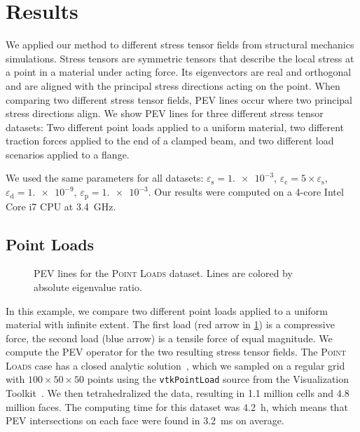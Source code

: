 \section{Results} %
\label{sec:pev_results}
%
We applied our method to different stress tensor fields from structural
mechanics simulations.
%
Stress tensors are symmetric tensors that describe the local stress at a point
in a material under acting force.
%
Its eigenvectors are real and orthogonal and are aligned with the principal
stress directions acting on the point.
%
When comparing two different stress tensor fields, \ac{PEV} lines occur where
two principal stress directions align.
%
We show \ac{PEV} lines for three different stress tensor datasets:
%
Two different point loads applied to a uniform material, two different traction
forces applied to the end of a clamped beam, and two different load scenarios
applied to a flange.
%

%
We used the same parameters for all datasets:
%
$\varepsilon_\mathrm{s} = \num{1.e-3}$, $\varepsilon_\mathrm{c} = 5 \times
\varepsilon_\mathrm{s}$, $\varepsilon_\mathrm{d} = \num{1.e-9}$,
$\varepsilon_\mathrm{p} = \num{1.e-3}$.
%
Our results were computed on a 4-core Intel Core i7 \ac{CPU} at
\SI{3.4}{\giga\hertz}.
%
\subsection{Point Loads} %
\label{ssub:point_loads}
%
\begin{figure}[t]
    \setlength\figurewidth\textwidth
    \centering
    
    \caption{\ac{PEV} lines for the \textsc{Point Loads} dataset. Lines are
             colored by absolute eigenvalue ratio.}
    \label{fig:point_load}
\end{figure}
%
In this example, we compare two different point loads applied to a uniform
material with infinite extent.
%
The first load (red arrow in \cref{fig:point_load}) is a compressive force,
the second load (blue arrow) is a tensile force of equal magnitude.
%
We compute the \ac{PEV} operator for the two resulting stress tensor fields.
%
The \textsc{Point Loads} case has a closed analytic solution~\cite{Saada2013},
which we sampled on a regular grid with $\num{100} \times \num{50} \times
\num{50}$ points using the \texttt{vtkPointLoad} source from the Visualization
Toolkit~\cite{Schroeder2006}.
%
We then tetrahedralized the data, resulting in \num{1.1} million cells and
\num{4.8} million faces.
%
The computing time for this dataset was \SI{4.2}{\hour}, which means that
\ac{PEV} intersections on each face were found in \SI{3.2}{\milli\second} on
average.
%

